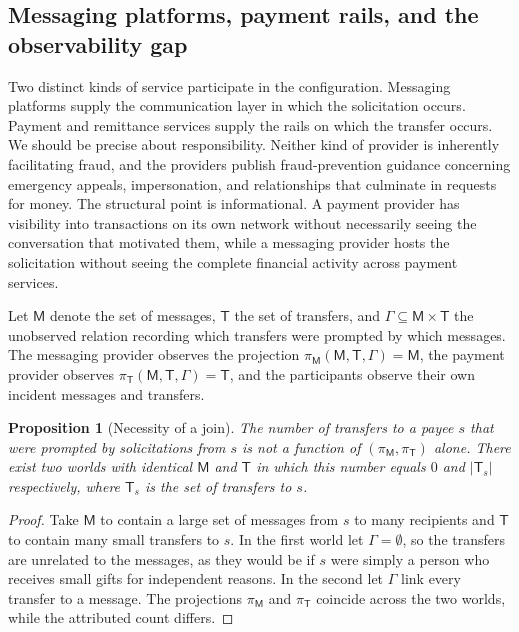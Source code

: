 \documentclass[11pt]{article}
\newtheorem{proposition}[theorem]{Proposition}
\theoremstyle{definition}
\theoremstyle{remark}
\begin{document}
\subsection{Messaging platforms, payment rails, and the observability gap}

Two distinct kinds of service participate in the configuration. Messaging platforms supply the communication layer in which the solicitation occurs. Payment and remittance services supply the rails on which the transfer occurs. We should be precise about responsibility. Neither kind of provider is inherently facilitating fraud, and the providers publish fraud-prevention guidance concerning emergency appeals, impersonation, and relationships that culminate in requests for money. The structural point is informational. A payment provider has visibility into transactions on its own network without necessarily seeing the conversation that motivated them, while a messaging provider hosts the solicitation without seeing the complete financial activity across payment services.

Let $\mathsf{M}$ denote the set of messages, $\mathsf{T}$ the set of transfers, and $\Gamma\subseteq\mathsf{M}\times\mathsf{T}$ the unobserved relation recording which transfers were prompted by which messages. The messaging provider observes the projection $\pi_{\mathsf{M}}(\mathsf{M},\mathsf{T},\Gamma)=\mathsf{M}$, the payment provider observes $\pi_{\mathsf{T}}(\mathsf{M},\mathsf{T},\Gamma)=\mathsf{T}$, and the participants observe their own incident messages and transfers.

\begin{proposition}[Necessity of a join]\label{prop:join}
The number of transfers to a payee $s$ that were prompted by solicitations from $s$ is not a function of $(\pi_{\mathsf{M}},\pi_{\mathsf{T}})$ alone. There exist two worlds with identical $\mathsf{M}$ and $\mathsf{T}$ in which this number equals $0$ and $|\mathsf{T}_s|$ respectively, where $\mathsf{T}_s$ is the set of transfers to $s$.
\end{proposition}

\begin{proof}
Take $\mathsf{M}$ to contain a large set of messages from $s$ to many recipients and $\mathsf{T}$ to contain many small transfers to $s$. In the first world let $\Gamma=\emptyset$, so the transfers are unrelated to the messages, as they would be if $s$ were simply a person who receives small gifts for independent reasons. In the second let $\Gamma$ link every transfer to a message. The projections $\pi_{\mathsf{M}}$ and $\pi_{\mathsf{T}}$ coincide across the two worlds, while the attributed count differs.
\end{proof}
\end{document}
